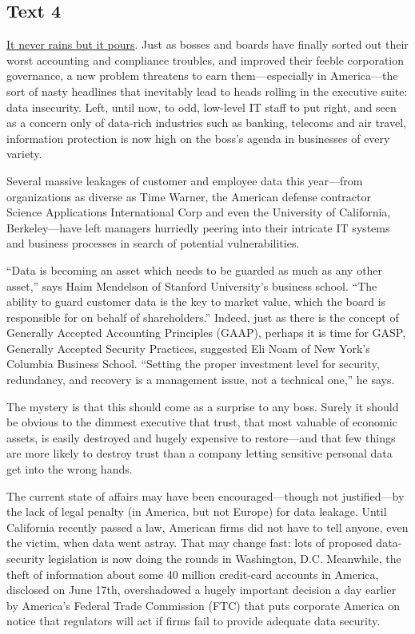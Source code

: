 \newpage
\subsection{Text 4}


\uline{It never rains but it pours}. Just as bosses and boards have finally
sorted out their worst accounting and compliance troubles, and improved
their feeble corporation governance, a new problem threatens to earn
them---especially in America---the sort of nasty headlines that
inevitably lead to heads rolling in the executive suite: data
insecurity. Left, until now, to odd, low-level IT staff to put right,
and seen as a concern only of data-rich industries such as banking,
telecoms and air travel, information protection is now high on the
boss's agenda in businesses of every variety.

Several massive leakages of customer and employee data this year---from
organizations as diverse as Time Warner, the American defense contractor
Science Applications International Corp and even the University of
California, Berkeley---have left managers hurriedly peering into their
intricate IT systems and business processes in search of potential
vulnerabilities.

``Data is becoming an asset which needs to be guarded as much as any
other asset,'' says Haim Mendelson of Stanford University's business
school. ``The ability to guard customer data is the key to market value,
which the board is responsible for on behalf of shareholders.'' Indeed,
just as there is the concept of Generally Accepted Accounting Principles
(GAAP), perhaps it is time for GASP, Generally Accepted Security
Practices, suggested Eli Noam of New York's Columbia Business School.
``Setting the proper investment level for security, redundancy, and
recovery is a management issue, not a technical one,'' he says.

The mystery is that this should come as a surprise to any boss. Surely
it should be obvious to the dimmest executive that trust, that most
valuable of economic assets, is easily destroyed and hugely expensive to
restore---and that few things are more likely to destroy trust than a
company letting sensitive personal data get into the wrong hands.

The current state of affairs may have been encouraged---though not
justified---by the lack of legal penalty (in America, but not Europe)
for data leakage. Until California recently passed a law, American firms
did not have to tell anyone, even the victim, when data went astray.
That may change fast: lots of proposed data-security legislation is now
doing the rounds in Washington,
D.C. Meanwhile, the theft of information
about some 40 million credit-card accounts in America, disclosed on June
17th, overshadowed a hugely important decision a day
earlier by America's Federal Trade Commission (FTC) that puts corporate
America on notice that regulators will act if firms fail to provide
adequate data security.

